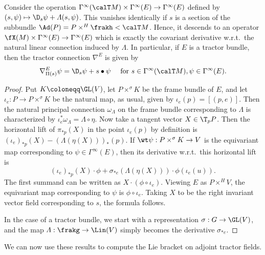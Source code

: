  \begin{thm}\label{thm 1.5.8 Cap}
    Consider the operation $\Gamma^\infty(\calT M)\times\Gamma^\infty(E)\to \Gamma^\infty(E)$ defined by $(s,\psi)\mapsto \D_s\psi+\varLambda(s,\psi)$. This vanishes identically if $s$ is a section of the subbundle $\Ad(P)=P\times^H\frakh<\calT M$. Hence, it descends to an operator $\fX(M)\times \Gamma^\infty(E)\to \Gamma^\infty(E)$ which is exactly the covariant derivative w.r.t.\ the natural linear connection induced by $\varLambda$. In particular, if $E$ is a tractor bundle, then the tractor connection $\nabla^E$ is given by 
    \[\nabla^E_{\Pi(s)}\psi =\D_s \psi+s\bullet \psi \quad \text{ for }s\in\Gamma^\infty(\calT M),\psi\in\Gamma^\infty(E).\]
 \end{thm}
 \begin{proof}
    Put $K\coloneqq \GL(V)$, let $P\times^\sigma K$ be the frame bundle of $E$, and let $\iota_e:P\to P\times^\sigma K$ be the natural map, as usual, given by $\iota_e(p)=[(p,e)]$. Then the natural principal connection $\omega_\varLambda$ on the frame bundle corresponding to $\varLambda$ is characterized by $\iota_e^\ast\omega_\varLambda=\varLambda\circ\eta$. Now take a tangent vector $X\in \T_p P$. Then the horizontal lift of $\pi_{\ast p}(X)$ in the point $\iota_e(p)$ by definition is $(\iota_e)_{\ast p}(X)-(\varLambda(\eta(X)))_\ast(p)$. If $\wt\psi:P\times^\sigma K\to V$ is the equivariant map corresponding to $\psi\in\Gamma^\infty(E)$, then its derivative w.r.t.\ this horizontal lift is 
    \[(\iota_e)_{\ast p}(X)\cdot \phi+\sigma_{\ast e}(\varLambda(\eta(X)))\cdot \phi(\iota_e(u)).\]
    The first summand can be written as $X\cdot (\phi\circ\iota_e)$. Viewing $E$ as $P\times^H V$, the equivariant map corresponding to $\psi$ is $\phi\circ \iota_e$. Taking $X$ to be the right invariant vector field corresponding to $s$, the formula follows.

    In the case of a tractor bundle, we start with a representation $\sigma:G\to \GL(V)$, and the map $\varLambda:\frakg\to \Lin(V)$ simply becomes the derivative $\sigma_{\ast e}$.
 \end{proof}

 We can now use these results to compute the Lie bracket on adjoint tractor fields.

